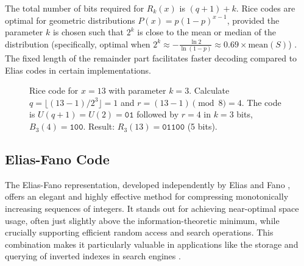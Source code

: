 \noindent The total number of bits required for $R_k(x)$ is $(q+1) + k$. Rice codes are optimal for geometric distributions $P(x) = p(1-p)^{x-1}$, provided the parameter $k$ is chosen such that $2^k$ is close to the mean or median of the distribution (specifically, optimal when $2^k \approx -\frac{\ln 2}{\ln(1-p)} \approx 0.69 \times \text{mean}(S)$) \cite{ferragina2023pearls, witten1999managing}. The fixed length of the remainder part facilitates faster decoding compared to Elias codes in certain implementations.

\begin{figure}[hbtp]
    \centering
    \caption{Rice code for $x=13$ with parameter $k=3$. Calculate $q = \lfloor (13-1) / 2^3 \rfloor = 1$ and $r = (13-1) \pmod 8 = 4$. The code is $U(q+1)=U(2)=\texttt{01}$ followed by $r=4$ in $k=3$ bits, $B_3(4)=\texttt{100}$. Result: $R_3(13)=\texttt{01100}$ (5 bits).}
    \label{fig:rice_code_example}
\end{figure}

\subsection{Elias-Fano Code}

The Elias-Fano representation, developed independently by Elias \cite{Elias1975} and Fano \cite{Fano1971}, offers an elegant and highly effective method for compressing monotonically increasing sequences of integers. It stands out for achieving near-optimal space usage, often just slightly above the information-theoretic minimum, while crucially supporting efficient random access and search operations. This combination makes it particularly valuable in applications like the storage and querying of inverted indexes in search engines \cite{ferragina2023pearls, EFVenturini2014}.

